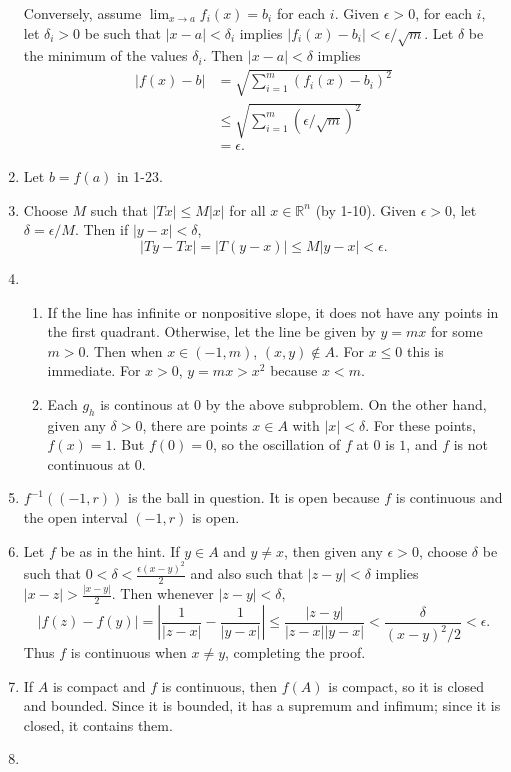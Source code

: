 \documentclass{article}
\begin{document}
\begin{enumerate}[label=\textbf{1-\arabic*.}]
Conversely, assume $\lim_{x\to a}f_i(x)= b_i$ for each $i$. Given $\epsilon > 0$, for each $i$, let $\delta_i > 0$ be such that $|x - a| < \delta_i$ implies $|f_i(x) - b_i| < \epsilon / \sqrt{m}$. Let $\delta$ be the minimum of the values $\delta_i$. Then $|x - a| < \delta$ implies 
\begin{align*}
|f(x) - b| &= \sqrt{\sum_{i=1}^m (f_i(x) - b_i)^2}\\
	&\leq \sqrt{\sum_{i=1}^m (\epsilon/\sqrt{m})^2}\\
	&= \epsilon.
\end{align*}
\item Let $b=f(a)$ in 1-23.
\item Choose $M$ such that $|Tx|\leq M|x|$ for all $x\in \mathbb R^n$ (by 1-10). Given $\epsilon > 0$, let $\delta = \epsilon/M$. Then if $|y-x| < \delta$, \[|Ty-Tx| = |T(y-x)| \leq M|y-x| < \epsilon.\]
\item
\begin{enumerate}
\item If the line has infinite or nonpositive slope, it does not have any points in the first quadrant. Otherwise, let the line be given by $y=mx$ for some $m>0$. Then when $x \in (-1,m)$, $(x,y)\notin A$. For $x \leq 0$ this is immediate. For $x > 0$, $y = mx > x^2$ because $x<m$.
\item Each $g_h$ is continous at $0$ by the above subproblem. On the other hand, given any $\delta > 0$, there are points $x\in A$ with $|x|<\delta$. For these points, $f(x) = 1$. But $f(0) = 0$, so the oscillation of $f$ at $0$ is $1$, and $f$ is not continuous at $0$.
\end{enumerate}
\item $f^{-1}((-1,r))$ is the ball in question. It is open because $f$ is continuous and the open interval $(-1,r)$ is open.
\item Let $f$ be as in the hint. If $y\in A$ and $y\neq x$, then given any $\epsilon > 0$, choose $\delta$ be such that $0 < \delta < \frac{\epsilon(x-y)^2}{2}$ and also such that $|z-y|<\delta$ implies $|x-z| > \frac{|x-y|}{2}$. Then whenever $|z-y|<\delta$, \[|f(z)-f(y)| = \left|\frac{1}{|z-x|}-\frac{1}{|y-x|}\right| \leq \frac{|z-y|}{|z-x||y-x|} < \frac{\delta}{(x-y)^2/2} < \epsilon.\] Thus $f$ is continuous when $x \neq y$, completing the proof.
\item If $A$ is compact and $f$ is continuous, then $f(A)$ is compact, so it is closed and bounded. Since it is bounded, it has a supremum and infimum; since it is closed, it contains them.
\item
\end{enumerate}
\end{document}
